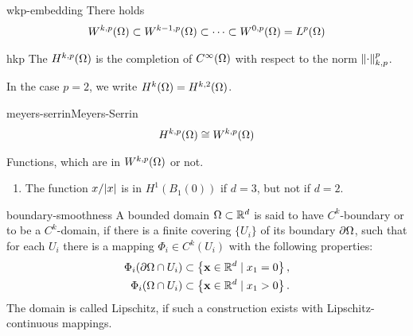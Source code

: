 \begin{Corollary}{wkp-embedding}
  There holds
  \begin{gather}
    W^{k,p}(\Omega) \subset W^{k-1,p}(\Omega) \subset \dots \subset
    W^{0,p}(\Omega) = L^{p}(\Omega)
  \end{gather}
\end{Corollary}

\begin{Definition}{hkp}
  The  $H^{k,p}(\Omega)$ is the completion of
  $C^\infty(\Omega)$ with respect to the norm $\lVert\cdot\rVert_{k,p}^p$.

  In the case $p=2$, we write $H^k(\Omega) = H^{k,2}(\Omega)$.
\end{Definition}

\begin{Theorem*}{meyers-serrin}{Meyers-Serrin}
  \begin{gather*}
    H^{k,p}(\Omega)\cong W^{k,p}(\Omega)
  \end{gather*}
\end{Theorem*}

\begin{example}
  Functions, which are in $W^{k,p}(\Omega)$ or not.
  \begin{enumerate}
  \item The function $x/\lvert x\rvert$ is in $H^1(B_1(0))$ if $d=3$, but not
    if $d=2$.
  \end{enumerate}
\end{example}

\begin{Definition}{boundary-smoothness}
  A bounded domain $\Omega\subset\mathbb R^d$ is said to have $C^k$-boundary
  or to be a $C^k$-domain, if there is a finite covering $\{U_i\}$ of
  its boundary $\partial\Omega$, such that for each $U_i$ there is
  a mapping $\Phi_i \in C^k(U_i)$ with the following properties:
  \begin{gather}
    \begin{split}
      \Phi_i(\partial\Omega \cap U_i)
      &\subset \left\{ \mathbf x\in\mathbb R^d \mid x_1 = 0 \right\},\\
      \Phi_i(\Omega \cap U_i)
      &\subset \left\{ \mathbf x\in\mathbb R^d \mid x_1 > 0 \right\}.      
    \end{split}
  \end{gather}
  The domain is called Lipschitz, if such a construction exists with
  Lipschitz-continuous mappings.
\end{Definition}


